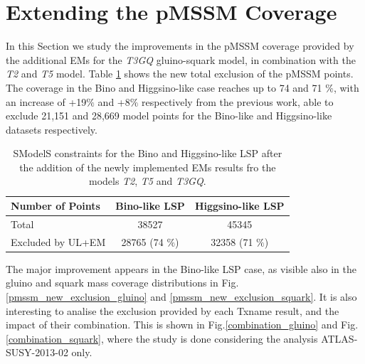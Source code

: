 \documentclass[a4paper,11pt]{article}
\begin{document}
\section{Extending the pMSSM Coverage}\label{sec::impact}
In this Section we study the improvements in the pMSSM coverage provided by the additional EMs for the \textit{T3GQ} gluino-squark model, in combination with the \textit{T2} and \textit{T5} model. Table \ref{Res_Tab_New} shows the new total exclusion of the pMSSM points. The coverage in the Bino and Higgsino-like case reaches up to 74 and 71 $\%$, with an increase of +19$\%$ and +8$\%$ respectively from the previous work, able to exclude 21,151 and 28,669 model points for the Bino-like and Higgsino-like datasets respectively. 
%
\begin{table}
\center
\renewcommand{\arraystretch}{1.3}
\begin{tabular}{ l | c   c  }
\textbf{Number of Points} & \textbf{Bino-like LSP }& \textbf{Higgsino-like LSP} \\
\toprule \toprule
Total   & 38527 & 45345 \\
Excluded by UL+EM & 28765 (74 $\%$) & 32358 (71 $\%$) \\ 
\hline
\end{tabular}
\caption{SModelS constraints for the Bino and Higgsino-like LSP after the addition of the newly implemented EMs results fro the models \textit{T2}, \textit{T5} and \textit{T3GQ}.}
\label{Res_Tab_New}
\end{table}
%
The major improvement appears in the Bino-like LSP case, as visible also in the gluino and squark mass coverage distributions in Fig. \ref{pmssm_new_exclusion_gluino} and \ref{pmssm_new_exclusion_squark}. 
%
It is also interesting to analise the exclusion provided by each Txname result, and the impact of their combination. This is shown in Fig.\ref{combination_gluino} and Fig.\ref{combination_squark}, where the study is done considering the analysis ATLAS-SUSY-2013-02 only. 
%
\end{document}

